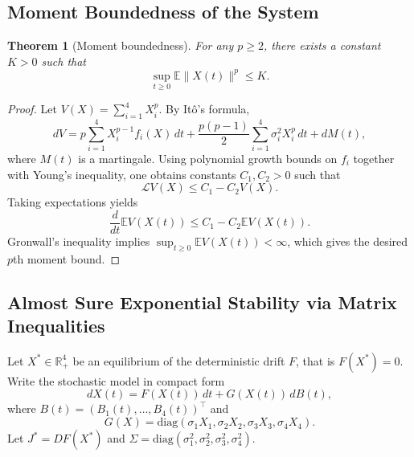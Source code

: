 \documentclass[11pt]{article}
\numberwithin{equation}{section}
\newtheorem{theorem}{Theorem}[section]
\begin{document}
\subsection{Moment Boundedness of the System}

\begin{theorem}[Moment boundedness]\label{thm:moment}
For any $p\ge 2$, there exists a constant $K>0$ such that
\[
\sup_{t\ge 0}\mathbb{E}\lVert X(t)\rVert^p\le K.
\]
\end{theorem}

\begin{proof}
Let $V(X)=\sum_{i=1}^4X_i^p$. By It\^o's formula,
\begin{equation}\label{eq:Ito_p}
dV
=p\sum_{i=1}^4X_i^{p-1}f_i(X)\,dt
+\frac{p(p-1)}{2}\sum_{i=1}^4\sigma_i^2X_i^p\,dt
+dM(t),
\end{equation}
where $M(t)$ is a martingale. Using polynomial growth bounds on $f_i$ together with Young's inequality, one obtains constants $C_1,C_2>0$ such that
\begin{equation}\label{eq:gen_p_bound}
\mathcal{L}V(X)\le C_1-C_2V(X).
\end{equation}
Taking expectations yields
\[
\frac{d}{dt}\mathbb{E}V(X(t))\le C_1-C_2\mathbb{E}V(X(t)).
\]
Gronwall's inequality implies $\sup_{t\ge 0}\mathbb{E}V(X(t))<\infty$, which gives the desired $p$th moment bound.
\end{proof}

\subsection{Almost Sure Exponential Stability via Matrix Inequalities}

Let $X^*\in\mathbb{R}_+^4$ be an equilibrium of the deterministic drift $F$, that is $F(X^*)=0$. Write the stochastic model in compact form
\begin{equation}\label{eq:compact_SDE}
dX(t)=F(X(t))\,dt+G(X(t))\,dB(t),
\end{equation}
where $B(t)=(B_1(t),\dots,B_4(t))^\top$ and
\begin{equation}\label{eq:G_def}
G(X)=\mathrm{diag}(\sigma_1X_1,\sigma_2X_2,\sigma_3X_3,\sigma_4X_4).
\end{equation}
Let $J^*=DF(X^*)$ and $\Sigma=\mathrm{diag}(\sigma_1^2,\sigma_2^2,\sigma_3^2,\sigma_4^2)$.
\end{document}
